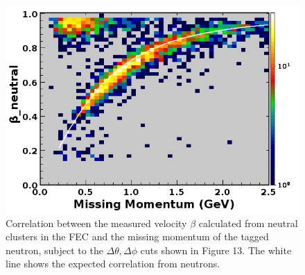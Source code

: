 \begin{figure}[hbt]
\centering
\includegraphics[width=1.0\columnwidth,keepaspectratio]{img/S10_4_2.png}
\caption[]{Correlation between the measured velocity $\beta$ calculated from neutral clusters in the FEC and the missing momentum of the tagged neutron, subject to the $\Delta\theta,\Delta\phi$ cuts shown in Figure 13.  The white line shows the expected correlation from neutrons.}
\label{fig:S10_4_2}
\end{figure}






